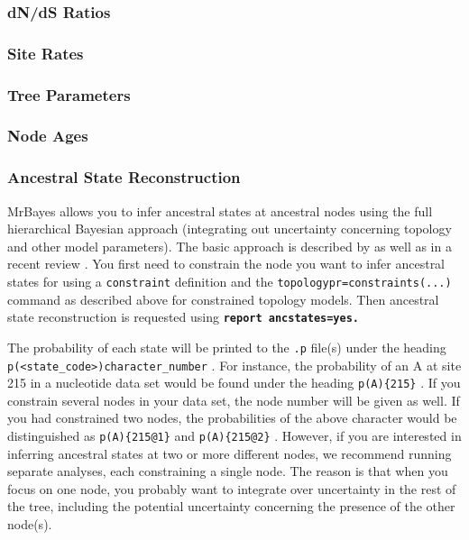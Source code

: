 \documentclass[12pt]{book}
\newcommand{\ttt}[1]{\texttt{#1} }
\newcommand{\tb}[1]{\ttt{\textbf{#1}} }
\begin{document}
\subsubsection{dN/dS Ratios}

\subsubsection{Site Rates}

\subsubsection{Tree Parameters}

\subsubsection{Node Ages}

\subsubsection{Ancestral State Reconstruction}
MrBayes allows you to infer ancestral states at ancestral nodes using the full hierarchical
Bayesian approach (integrating out uncertainty concerning topology and other model parameters). The
basic approach is described by \citet{huelsenbeck01a} as well as in a recent review
\citep{ronquist04a}. You first need to constrain the node you want to infer ancestral states for
using a \ttt{constraint} definition and the \ttt{topologypr=constraints(...)} command as described
above for constrained topology models. Then ancestral state reconstruction is requested using
\tb{report ancstates=yes.}

The probability of each state will be printed to the \ttt{.p} file(s) under the heading
\ttt{p(<state\_code>){character\_number}}. For instance, the probability of an A at site 215 in a
nucleotide data set would be found under the heading \ttt{p(A)\{215\}}. If you constrain several
nodes in your data set, the node number will be given as well. If you had constrained two nodes,
the probabilities of the above character would be distinguished as \ttt{p(A)\{215@1\}} and
\ttt{p(A)\{215@2\}}. However, if you are interested in inferring ancestral states at two or more
different nodes, we recommend running separate analyses, each constraining a single node. The
reason is that when you focus on one node, you probably want to integrate over uncertainty in the
rest of the tree, including the potential uncertainty concerning the presence of the other node(s).
\end{document}
